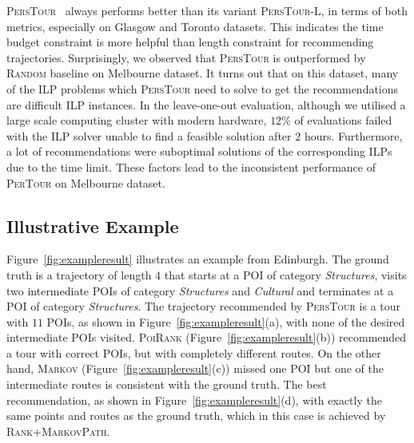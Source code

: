 \textsc{PersTour}~\cite{ijcai15} always performs better than its variant \textsc{PersTour-L},
in terms of both metrics, especially on Glasgow and Toronto datasets.
This indicates the time budget constraint is more helpful than length constraint for recommending trajectories.
Surprisingly, we observed that \textsc{PersTour} is outperformed by \textsc{Random} baseline on Melbourne dataset. %
It turns out that on this dataset, many of the ILP problems
which \textsc{PersTour} need to solve to get the recommendations are difficult ILP instances.
In the leave-one-out evaluation, although we utilised a large scale computing cluster with modern hardware,
$12\%$ of evaluations failed with the ILP solver unable to find a feasible solution after $2$ hours.
Furthermore, a lot of recommendations were suboptimal solutions of the corresponding ILPs due to
the time limit. These factors lead to the inconsistent performance of \textsc{PerTour} on Melbourne dataset.



\subsection{Illustrative Example}
\label{sec:example}



Figure~\ref{fig:exampleresult} illustrates an example %
from Edinburgh.
The ground truth is a trajectory of length $4$ that starts at a POI of category \textit{Structures},
visits two intermediate POIs of category \textit{Structures} and \textit{Cultural} and
terminates at a POI of category \textit{Structures}.
The trajectory recommended by \textsc{PersTour} is a tour with $11$ POIs, as shown in Figure~\ref{fig:exampleresult}(a),
with none of the desired intermediate POIs visited.
\textsc{PoiRank} (Figure~\ref{fig:exampleresult}(b)) recommended a tour with correct POIs,
but with completely different routes.
On the other hand, \textsc{Markov} (Figure~\ref{fig:exampleresult}(c)) missed one POI
but one of the intermediate routes is consistent with the ground truth.
The best recommendation, as shown in Figure~\ref{fig:exampleresult}(d),
with exactly the same points and routes as the ground truth,
which in this case is achieved by \textsc{Rank+MarkovPath}.
